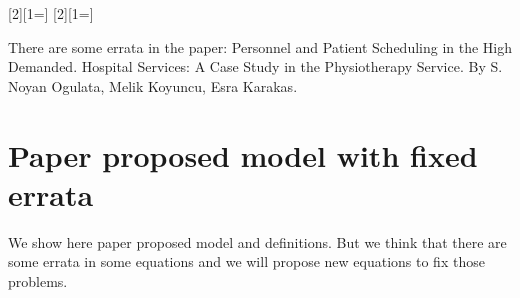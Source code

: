 \documentclass[a4paper,12pt]{article}
\begin{document}
\clearpage
{}
\setcounter{page}{1}

\tableofcontents






\clearpage
{}
\setcounter{page}{1}


%
[2][1=]{}
[2][1=]{}
%
%




There are some errata in the paper: Personnel and Patient Scheduling in the High Demanded. Hospital Services: A Case Study in the Physiotherapy Service. By S. Noyan Ogulata, Melik Koyuncu, Esra Karakas\cite{ogulata2008personnel}.

\section{Paper proposed model with fixed errata}
We show here paper proposed model and definitions. But we think that there are some errata in some equations and we will propose new equations to fix those problems.
\end{document}
